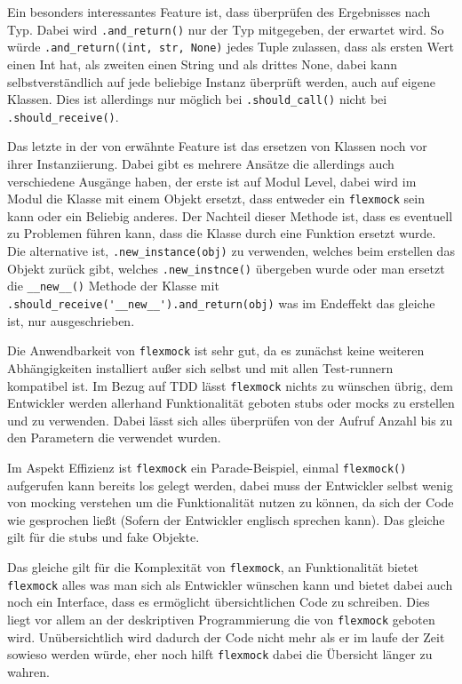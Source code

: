 Ein besonders interessantes Feature ist, dass überprüfen des Ergebnisses nach Typ. Dabei
wird \lstinline{.and_return()} nur der Typ mitgegeben, der erwartet wird. So würde
\lstinline{.and_return((int, str, None)} jedes Tuple zulassen, dass als ersten Wert einen
Int hat, als zweiten einen String und als drittes None, dabei kann selbstverständlich auf
jede beliebige Instanz überprüft werden, auch auf eigene Klassen. Dies ist allerdings nur
möglich bei \lstinline{.should_call()} nicht bei \lstinline{.should_receive()}.

Das letzte in der von \cite{flexmock:docs:0.10.3} erwähnte Feature ist das ersetzen von
Klassen noch vor ihrer Instanziierung. Dabei gibt es mehrere Ansätze die allerdings auch
verschiedene Ausgänge haben, der erste ist auf Modul Level, dabei wird im Modul die Klasse
mit einem Objekt ersetzt, dass entweder ein \lstinline{flexmock} sein kann oder ein Beliebig
anderes. Der Nachteil dieser Methode ist, dass es eventuell zu Problemen führen kann, dass
die Klasse durch eine Funktion ersetzt wurde. Die alternative ist, \lstinline{.new_instance(obj)}
zu verwenden, welches beim erstellen das Objekt zurück gibt, welches \lstinline{.new_instnce()}
übergeben wurde oder man ersetzt die \lstinline{__new__()} Methode der Klasse mit
\lstinline{.should_receive('__new__').and_return(obj)} was im Endeffekt das gleiche ist, nur
ausgeschrieben.

Die Anwendbarkeit von \lstinline{flexmock} ist sehr gut, da es zunächst keine
weiteren Abhängigkeiten installiert außer sich selbst und mit allen Test-runnern
kompatibel ist. Im Bezug auf TDD lässt \lstinline{flexmock} nichts zu wünschen übrig,
dem Entwickler werden allerhand Funktionalität geboten \Glspl{stub} oder \Glspl{mock} zu
erstellen und zu verwenden. Dabei lässt sich alles überprüfen von der Aufruf Anzahl bis zu
den Parametern die verwendet wurden.

Im Aspekt Effizienz ist \lstinline{flexmock} ein Parade-Beispiel, einmal \lstinline{flexmock()}
aufgerufen kann bereits los gelegt werden, dabei muss der Entwickler selbst wenig von
\gls{mock}ing verstehen um die Funktionalität nutzen zu können, da sich der Code wie gesprochen
ließt (Sofern der Entwickler englisch sprechen kann). Das gleiche gilt für die \Glspl{stub} und
fake Objekte.

Das gleiche gilt für die Komplexität von \lstinline{flexmock}, an Funktionalität bietet
\lstinline{flexmock} alles was man sich als Entwickler wünschen kann und bietet dabei auch
noch ein Interface, dass es ermöglicht übersichtlichen Code zu schreiben. Dies liegt vor allem
an der deskriptiven Programmierung die von \lstinline{flexmock} geboten wird. Unübersichtlich
wird dadurch der Code nicht mehr als er im laufe der Zeit sowieso werden würde, eher noch hilft
\lstinline{flexmock} dabei die Übersicht länger zu wahren.


